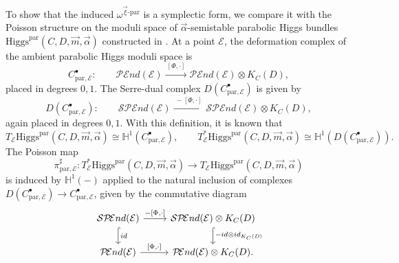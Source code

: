 \documentclass[11pt]{amsart}
\theoremstyle{plain}
\theoremstyle{definition}
\theoremstyle{remark}
\newcommand{\End}{\mathcal E nd}
\newcommand{\HH}{\mathbb H}
\newcommand{\PEnd}{\mathcal P\!\End}
\newcommand{\SPEnd}{\mathcal{SP}\!\End}
\newcommand{\Higgs}{\mathrm{Higgs}}
\def\a{\alpha}
\def\vxi{\vec{\xi}}
\def\vm{\vec{m}}
\def\va{\vec{\a}}
\begin{document}
To show that the induced $\omega^{\vxi\text{-par}}$ is a symplectic form, we compare it with the Poisson structure on the moduli space of $\va$-semistable parabolic Higgs bundles $\Higgs^{\text{par}}(C,D,\vm,\va)$ constructed in \cite[Theorem 3.1]{logaresMartens}. At a point $\mathcal E$, the deformation complex of the ambient parabolic Higgs moduli space is
\[
C_{\text{par},\mathcal E}^\bullet:
\qquad
\PEnd(\mathcal E)
\xrightarrow{\ [\Phi,\cdot]\ }
\PEnd(\mathcal E)\otimes K_C(D),
\]
placed in degrees $0,1$. The Serre-dual complex $D(C_{\text{par},\mathcal E}^\bullet)$ is given by
\[
D(C_{\text{par},\mathcal E}^\bullet):
\qquad
\SPEnd(\mathcal E)
\xrightarrow{\ -[\Phi,\cdot]\ }
\SPEnd(\mathcal E)\otimes K_C(D),
\]
again placed in degrees $0,1$. With this definition, it is known that 
\[
T_\mathcal E\Higgs^{\text{par}}(C,D,\vm,\va)
\cong
\HH^1(C_{\text{par},\mathcal E}^\bullet),
\qquad
T^*_\mathcal E\Higgs^{\text{par}}(C,D,\vm,\va)
\cong
\HH^1(D(C_{\text{par},\mathcal E}^\bullet)).
\]
\noindent The Poisson map
\[
\pi^\sharp_{\text{par},\mathcal E}:
T^*_\mathcal E\Higgs^{\text{par}}(C,D,\vm,\va)
\longrightarrow
T_\mathcal E\Higgs^{\text{par}}(C,D,\vm,\va)
\]
is induced by $\HH^1(-)$ applied to the natural inclusion of complexes $
D(C_{\text{par},\mathcal E}^\bullet)
\longrightarrow
C_{\text{par},\mathcal E}^\bullet$, given by the commutative diagram
\begin{equation}\label{e:par serrredual map}
    \begin{tikzcd}
    \SPEnd(\mathcal E)
    \arrow[r, "{-[\Phi,\cdot]}"]
    \arrow[d, hook, "id"]
    &
    \SPEnd(\mathcal E)\otimes K_C(D)
    \arrow[d, hook, "-id \otimes id_{K_C(D)}"]
    \\
    \PEnd(\mathcal E)
    \arrow[r, "{[\Phi,\cdot]}"]
    &
    \PEnd(\mathcal E)\otimes K_C(D).
\end{tikzcd}
\end{equation}
\end{document}
